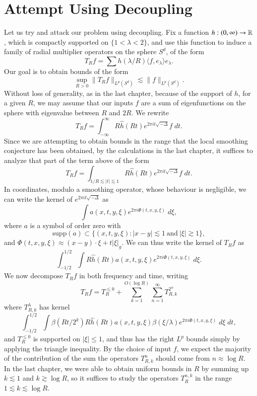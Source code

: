 \chapter{Attempt Using Decoupling}

Let us try and attack our problem using decoupling. Fix a function $h: (0,\infty) \to \operatorname{\mathbb{R}}$, which is compactly supported on $\{ 1 < \lambda < 2 \}$, and use this function to induce a family of radial multiplier operators on the sphere $S^d$, of the form
%
\[ T_R f = \sum h(\lambda / R) \langle f, e_\lambda \rangle e_\lambda. \]
%
Our goal is to obtain bounds of the form
%
\[ \sup_{R > 0} \| T_R f \|_{L^p(S^d)} \lesssim \| f \|_{L^p(S^d)}. \]
%
Without loss of generality, as in the last chapter, because of the support of $h$, for a given $R$, we may assume that our inputs $f$ are a sum of eigenfunctions on the sphere with eigenvalue between $R$ and $2R$. We rewrite
%
\[ T_Rf = \int_{-\infty}^\infty R \widehat{h}(Rt) e^{2 \pi i t \sqrt{-\Delta}} f\; dt. \]
%
Since we are attempting to obtain bounds in the range that the local smoothing conjecture has been obtained, by the calculations in the last chapter, it suffices to analyze that part of the term above of the form
%
\[ T_Rf = \int_{1/R \lesssim |t| \lesssim 1} R \widehat{h}(Rt) e^{2 \pi i t \sqrt{-\Delta}} f\; dt. \]
%
%
%
%
%
In coordinates, modulo a smoothing operator, whose behaviour is negligible, we can write the kernel of $e^{2 \pi i t \sqrt{-\Delta}}$ as
%
\[ \int a(x,t,y,\xi) e^{2 \pi i \Phi(t,x,y,\xi)}\; d\xi, \]
%
where $a$ is a symbol of order zero with
%
\[ \text{supp}(a) \subset \{ (x,t,y,\xi): |x - y| \lesssim 1\ \text{and}\ |\xi| \gtrsim 1 \}, \]
%
and $\Phi(t,x,y,\xi) \approx (x - y) \cdot \xi + t |\xi|_g$. We can thus write the kernel of $T_R f$ as
%
\[ \int_{-1/2}^{1/2} \int R \widehat{h}(Rt) a(x,t,y,\xi) e^{2 \pi i \Phi(t,x,y,\xi)}\; d\xi. \]
%
We now decompose $T_R f$ in both frequency and time, writing
%
\[ T_R f = T_R^{\leq 0} + \sum_{k = 1}^{O(\log R)} \sum_{n = 1}^\infty T_{R,k}^{2^n} \]
%
where $T_{R,k}^{\lambda}$ has kernel
%
\[ \int_{-1/2}^{1/2} \int \beta(Rt/2^k) R \widehat{h}(Rt) a(x,t,y,\xi) \beta(\xi / \lambda) e^{2 \pi i \Phi(t,x,y,\xi)}\; d\xi\; dt, \]
%
and $T_R^{\leq 0}$ is supported on $|\xi| \leq 1$, and thus has the right $L^p$ bounds simply by applying the triangle inequality. By the choice of input $f$, we expect the majority of the contribution of the sum the operators $T_{R,k}^n$ should come from $n \approx \log R$. In the last chapter, we were able to obtain uniform bounds in $R$ by summing up $k \lesssim 1$ and $k \gtrsim \log R$, so it suffices to study the operators $T_R^{n,k}$ in the range $1 \lesssim k \lesssim \log R$.

